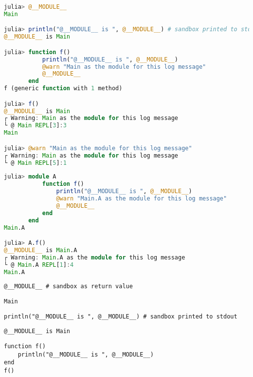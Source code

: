 \begin{lstlisting}[language=julia, style=jlcodestyle]
julia> @__MODULE__
Main

julia> println("@__MODULE__ is ", @__MODULE__) # sandbox printed to stdout
@__MODULE__ is Main

julia> function f()
           println("@__MODULE__ is ", @__MODULE__)
           @warn "Main as the module for this log message"
           @__MODULE__
       end
f (generic function with 1 method)

julia> f()
@__MODULE__ is Main
┌ Warning: Main as the module for this log message
└ @ Main REPL[3]:3
Main

julia> @warn "Main as the module for this log message"
┌ Warning: Main as the module for this log message
└ @ Main REPL[5]:1
\end{lstlisting}




\begin{lstlisting}[language=julia, style=jlcodestyle]
julia> module A
           function f()
               println("@__MODULE__ is ", @__MODULE__)
               @warn "Main.A as the module for this log message"
               @__MODULE__
           end
       end
Main.A

julia> A.f()
@__MODULE__ is Main.A
┌ Warning: Main.A as the module for this log message
└ @ Main.A REPL[1]:4
Main.A
\end{lstlisting}




\begin{lstlisting}[]
@__MODULE__ # sandbox as return value
\end{lstlisting}


\begin{lstlisting}[]
Main
\end{lstlisting}




\begin{lstlisting}[]
println("@__MODULE__ is ", @__MODULE__) # sandbox printed to stdout
\end{lstlisting}


\begin{lstlisting}[]
@__MODULE__ is Main
\end{lstlisting}




\begin{lstlisting}[]
function f()
    println("@__MODULE__ is ", @__MODULE__)
end
f()
\end{lstlisting}


